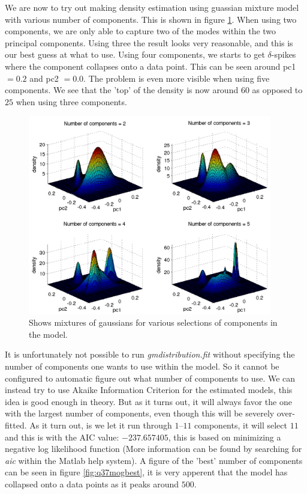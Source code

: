 \newpage

We are now to try out making density estimation using guassian mixture
model with various number of components. This is shown in figure
\ref{fig:q37mog}. When using two components, we are only able to
capture two of the modes within the two principal components. Using
three the result looks very reasonable, and this is our best guess at
what to use. Using four components, we starts to get $\delta$-spikes
where the component collapses onto a data point. This can be seen
around pc1 $= 0.2$ and pc2 $= 0.0$. The problem is even more visible
when using five components. We see that the 'top' of the density is
now around $60$ as opposed to $25$ when using three components.

\begin{figure}[!htbp]
  \centering
  \includegraphics[width=0.95\textwidth]{./images/q37mog}
  \caption{Shows mixtures of gaussians for various selections of
    components in the model.}
  \label{fig:q37mog}
\end{figure}

It is unfortunately not possible to run \emph{gmdistribution.fit}
without specifying the number of components one wants to use within
the model. So it cannot be configured to automatic figure out what
number of components to use. We can instead try to use Akaike
Information Criterion for the estimated models, this idea is good
enough in theory. But as it turns out, it will always favor the one
with the largest number of components, even though this will be
severely over-fitted. As it turn out, is we let it run through
$1$--$11$ components, it will select $11$ and this is with the AIC
value: $-237.657405$, this is based on minimizing a negative log
likelihood function (More information can be found by searching for
\emph{aic} within the Matlab help system). A figure of the 'best'
number of components can be seen in figure \ref{fig:q37mogbest}, it is
very apperent that the model has collapsed onto a data points as it
peaks around $500$.

